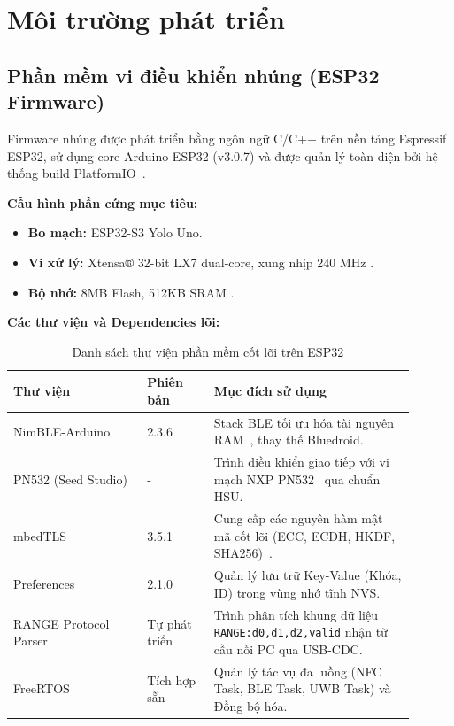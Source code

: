 \section{Môi trường phát triển}

\subsection{Phần mềm vi điều khiển nhúng (ESP32 Firmware)}
Firmware nhúng được phát triển bằng ngôn ngữ C/C++ trên nền tảng Espressif ESP32, sử dụng core Arduino-ESP32 (v3.0.7) và được quản lý toàn diện bởi hệ thống build PlatformIO~\cite{platformio_docs}.

\textbf{Cấu hình phần cứng mục tiêu:}
\begin{itemize}
    \item \textbf{Bo mạch:} ESP32-S3 Yolo Uno.
    \item \textbf{Vi xử lý:} Xtensa® 32-bit LX7 dual-core, xung nhịp 240 MHz \cite{esp32s3}.
    \item \textbf{Bộ nhớ:} 8MB Flash, 512KB SRAM \cite{esp32s3}.
\end{itemize}

\textbf{Các thư viện và Dependencies lõi:}

\begin{table}[H]
    \centering
    \begin{tabular}{|p{0.3\linewidth}|p{0.15\linewidth}|p{0.45\linewidth}|}
        \hline
        \textbf{Thư viện} & \textbf{Phiên bản} & \textbf{Mục đích sử dụng} \\
        \hline
        NimBLE-Arduino & 2.3.6 & Stack BLE tối ưu hóa tài nguyên RAM~\cite{nimble_arduino}, thay thế Bluedroid. \\
        \hline
        PN532 (Seed Studio) & - & Trình điều khiển giao tiếp với vi mạch NXP PN532~\cite{nxp_pn532} qua chuẩn HSU. \\
        \hline
        mbedTLS & 3.5.1 & Cung cấp các nguyên hàm mật mã cốt lõi (ECC, ECDH, HKDF, SHA256)~\cite{mbedtls_docs}. \\
        \hline
        Preferences & 2.1.0 & Quản lý lưu trữ Key-Value (Khóa, ID) trong vùng nhớ tĩnh NVS. \\
        \hline
        RANGE Protocol Parser & Tự phát triển & Trình phân tích khung dữ liệu \texttt{RANGE:d0,d1,d2,valid} nhận từ cầu nối PC qua USB-CDC. \\
        \hline
        FreeRTOS & Tích hợp sẵn & Quản lý tác vụ đa luồng (NFC Task, BLE Task, UWB Task) và Đồng bộ hóa. \\
        \hline
    \end{tabular}
    \caption{Danh sách thư viện phần mềm cốt lõi trên ESP32}
    \label{tab:esp_libs}
\end{table}

